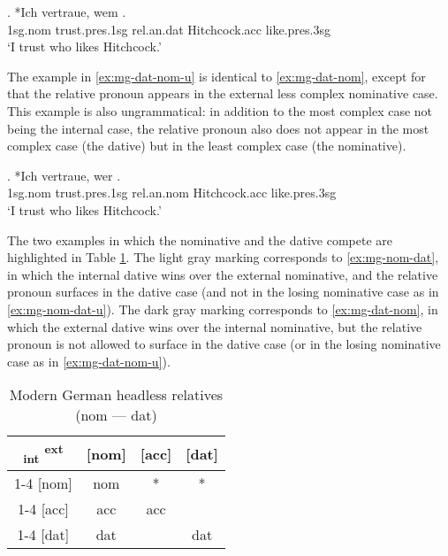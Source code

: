 \exg. *Ich vertraue, wem  .\\
1\ac{sg}.\ac{nom} trust.\ac{pres}.1\ac{sg}\scsub{[dat]} \ac{rel}.\ac{an}.\ac{dat} Hitchcock.\ac{acc} like.\ac{pres}.3\ac{sg}\scsub{[nom]}\\
`I trust who likes Hitchcock.' \label{ex:mg-dat-nom}

The example in \ref{ex:mg-dat-nom-u} is identical to \ref{ex:mg-dat-nom}, except for that the relative pronoun appears in the external less complex nominative case. This example is also ungrammatical: in addition to the most complex case not being the internal case, the relative pronoun also does not appear in the most complex case (the dative) but in the least complex case (the nominative).

\exg. *Ich vertraue, wer  .\\
1\ac{sg}.\ac{nom} trust.\ac{pres}.1\ac{sg}\scsub{[dat]} \ac{rel}.\ac{an}.\ac{nom} Hitchcock.\ac{acc} like.\ac{pres}.3\ac{sg}\scsub{[nom]}\\
`I trust who likes Hitchcock.' \label{ex:mg-dat-nom-u}

The two examples in which the nominative and the dative compete are highlighted in Table \ref{tbl:case-competition-mg-nom-dat}.
The light gray marking corresponds to \ref{ex:mg-nom-dat}, in which the internal dative wins over the external nominative, and the relative pronoun surfaces in the dative case (and not in the losing nominative case as in \ref{ex:mg-nom-dat-u}).
The dark gray marking corresponds to \ref{ex:mg-dat-nom}, in which the external dative wins over the internal nominative, but the relative pronoun is not allowed to surface in the dative case (or in the losing nominative case as in \ref{ex:mg-dat-nom-u}).

\begin{table}[H]
  \center
  \caption{Modern German headless relatives (\ac{nom} --- \ac{dat})}
  \begin{tabular}{c|c|c|c}
    \toprule
    \textsubscript{\ac{int}} \textsuperscript{\ac{ext}}
           & [\ac{nom}]
           & [\ac{acc}]
           & [\ac{dat}]
           \\ \cmidrule{1-4}
       [\ac{nom}]
           & \ac{nom}
           & *
           & \cellcolor{DG}*
           \\ \cmidrule{1-4}
       [\ac{acc}]
           & \ac{acc}
           & \ac{acc}
           &
           \\ \cmidrule{1-4}
       [\ac{dat}]
           & \cellcolor{LG}\ac{dat}
           &
           & \ac{dat}
           \\
     \bottomrule
  \end{tabular}
    \label{tbl:case-competition-mg-nom-dat}
\end{table}

